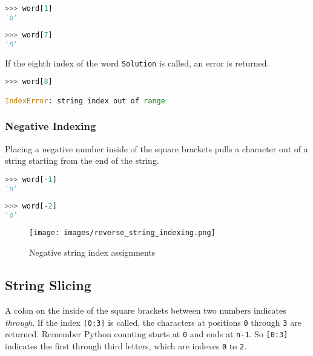 \documentclass{book}
\makeatletter
\def\maxwidth{\ifdim\Gin@nat@width>\linewidth\linewidth
\else\Gin@nat@width\fi}
\let\Oldincludegraphics\includegraphics
\renewcommand{\includegraphics}[1]{\Oldincludegraphics[width=.8\maxwidth]{#1}}
\newcommand{\passthrough}[1]{#1}
\makeatother
\begin{document}
    
        \begin{lstlisting}[language=Python]
>>> word[1]
'o'
\end{lstlisting}
    




    
        \begin{lstlisting}[language=Python]
>>> word[7]
'n'
\end{lstlisting}
    




    
        If the eighth index of the word \passthrough{\lstinline!Solution!} is
called, an error is returned.

\begin{lstlisting}[language=Python]
>>> word[8]

IndexError: string index out of range
\end{lstlisting}
    




    
        \hypertarget{negative-indexing}{%
\subsubsection{Negative Indexing}\label{negative-indexing}}

Placing a negative number inside of the square brackets pulls a
character out of a string starting from the end of the string.

\begin{lstlisting}[language=Python]
>>> word[-1]
'n'
\end{lstlisting}

\begin{lstlisting}[language=Python]
>>> word[-2]
'o'
\end{lstlisting}

\begin{figure}
\centering
\texttt{[image: images/reverse\_string\_indexing.png]}
\caption{Negative string index assignments}
\end{figure}
    




    
        \hypertarget{string-slicing}{%
\subsection{String Slicing}\label{string-slicing}}

A colon on the inside of the square brackets between two numbers
indicates \emph{through}. If the index \passthrough{\lstinline![0:3]!}
is called, the characters at positions \passthrough{\lstinline!0!}
through \passthrough{\lstinline!3!} are returned. Remember Python
counting starts at \passthrough{\lstinline!0!} and ends at
\passthrough{\lstinline!n-1!}. So \passthrough{\lstinline![0:3]!}
indicates the first through third letters, which are indexes
\passthrough{\lstinline!0!} to \passthrough{\lstinline!2!}.
\end{document}
